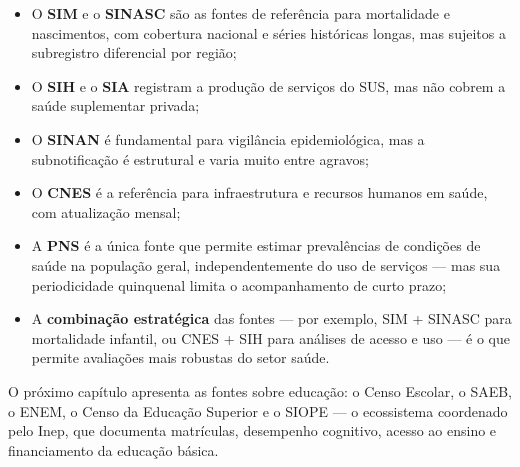 \begin{itemize}
  \item O \textbf{SIM} e o \textbf{SINASC} são as fontes de referência para mortalidade e nascimentos, com cobertura nacional e séries históricas longas, mas sujeitos a subregistro diferencial por região;
  \item O \textbf{SIH} e o \textbf{SIA} registram a produção de serviços do SUS, mas não cobrem a saúde suplementar privada;
  \item O \textbf{SINAN} é fundamental para vigilância epidemiológica, mas a subnotificação é estrutural e varia muito entre agravos;
  \item O \textbf{CNES} é a referência para infraestrutura e recursos humanos em saúde, com atualização mensal;
  \item A \textbf{PNS} é a única fonte que permite estimar prevalências de condições de saúde na população geral, independentemente do uso de serviços --- mas sua periodicidade quinquenal limita o acompanhamento de curto prazo;
  \item A \textbf{combinação estratégica} das fontes --- por exemplo, SIM + SINASC para mortalidade infantil, ou CNES + SIH para análises de acesso e uso --- é o que permite avaliações mais robustas do setor saúde.
\end{itemize}

\medskip

O próximo capítulo apresenta as fontes sobre educação: o Censo Escolar, o SAEB, o ENEM, o Censo da Educação Superior e o SIOPE --- o ecossistema coordenado pelo Inep, que documenta matrículas, desempenho cognitivo, acesso ao ensino e financiamento da educação básica.